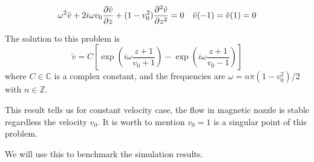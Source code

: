 \begin{equation} \label{eq:constant-v-problem-dirichlet}
    \omega^2\tilde{v} + 2i\omega v_0\pdv{\tilde{v}}{z} + (1-v_0^2)\pdv[2]{\tilde{v}}{z} = 0
    \quad
    \tilde{v}(-1) = \tilde{v}(1) = 0
\end{equation}

The solution to this problem is
\begin{equation} \label{eq:constant-v-solution-dirichlet}
    \tilde{v} = C\left[ \exp\left(i\omega\frac{z+1}{v_0+1}\right) - \exp\left(i\omega\frac{z+1}{v_0-1}\right) \right]
\end{equation}
where $C\in\mathbb{C}$ is a complex constant, and the frequencies are $\omega=n\pi(1-v_0^2)/2$ with $n\in\mathbb{Z}$.

This result tells us for constant velocity case, the flow in magnetic nozzle is stable regardless the velocity $v_0$. It is worth to mention $v_0=1$ is a singular point of this problem.

We will use this to benchmark the simulation results.

